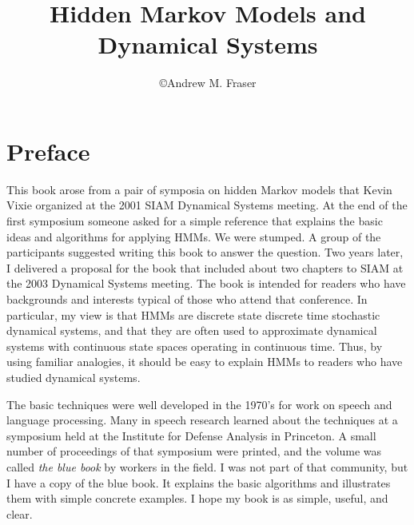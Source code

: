 \documentclass[]{hmmdsbook}
\author{\copyright Andrew M. Fraser}
\title{Hidden Markov Models and Dynamical Systems}
\begin{document}
\frontmatter
\maketitle

\chapter*{Preface}
\label{chap:preface}
This book arose from a pair of symposia on hidden Markov models that
Kevin Vixie organized at the 2001 SIAM Dynamical Systems meeting.  At
the end of the first symposium someone asked for a simple reference
that explains the basic ideas and algorithms for applying HMMs.  We
were stumped.  A group of the participants suggested writing this book
to answer the question.  Two years later, I delivered a proposal for
the book that included about two chapters to SIAM at the 2003
Dynamical Systems meeting.  The book is intended for readers who have
backgrounds and interests typical of those who attend that conference.
In particular, my view is that HMMs are discrete state discrete time
stochastic dynamical systems, and that they are often used to
approximate dynamical systems with continuous state spaces operating
in continuous time.  Thus, by using familiar analogies, it should be
easy to explain HMMs to readers who have studied dynamical systems.

The basic techniques were well developed in the 1970's for work on
speech and language processing.  Many in speech research learned about
the techniques at a symposium held at the Institute for Defense
Analysis  in Princeton.  A small
number of proceedings of that symposium \cite{ida80} were printed, and
the volume was called \emph{the blue book} by workers in the field.  I
was not part of that community, but I have a copy of the blue book.
It explains the basic algorithms and illustrates them with simple
concrete examples.  I hope my book is as simple, useful, and clear.
\end{document}
